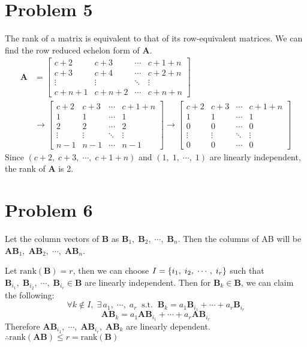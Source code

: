 \documentclass[10pt]{article}
\begin{document}
\section*{Problem 5}
The rank of a matrix is equivalent to that of its row-equivalent matrices.
We can find the row reduced echelon form of $\mathbf{A}$.
\begin{align*}
    \mathbf{A} &= \begin{bmatrix}
        c+2 & c+3 & \cdots & c+1+n \\
        c+3 & c+4 & \cdots & c+2+n \\
        \vdots & \vdots & \ddots & \vdots \\
        c+n+1 & c+n+2 & \cdots & c+n+n
    \end{bmatrix} \\
    &\rightarrow \begin{bmatrix}
        c+2 & c+3 & \cdots & c+1+n \\
        1 & 1 & \cdots & 1 \\
        2 & 2 & \cdots & 2 \\
        \vdots & \vdots & \ddots & \vdots \\
        n-1 & n-1 & \cdots & n-1
    \end{bmatrix} 
    \rightarrow \begin{bmatrix}
        c+2 & c+3 & \cdots & c+1+n \\
        1 & 1 & \cdots & 1 \\
        0 & 0 & \cdots & 0 \\
        \vdots & \vdots & \ddots & \vdots \\
        0 & 0 & \cdots & 0
    \end{bmatrix}
\end{align*}
Since $(c+2, \; c+3, \; \cdots, \; c+1+n)$ and $(1, \; 1, \; \cdots, \; 1)$ are linearly independent, the rank of $\mathbf{A}$ is 2.

\section*{Problem 6}
Let the column vectors of $\mathbf{B}$ as $\mathbf{B}_1, \; \mathbf{B}_2, \; \cdots , \; \mathbf{B}_n$.
Then the columns of AB will be $\mathbf{AB}_1, \; \mathbf{AB}_2, \; \cdots , \; \mathbf{AB}_n$.
\vspace{2mm}

Let $\mathrm{rank}(\mathbf{B}) = r$, then we can choose $I = \qty{i_1, \; i_2, \; \cdots , \; i_r}$ such that $\mathbf{B}_{i_1}, \; \mathbf{B}_{i_2}, \; \cdots , \; \mathbf{B}_{i_r} \in \mathbf{B}$ are linearly independent.
Then for $\mathbf{B}_k \in \mathbf{B}$, we can claim the following:
$$\forall k \notin I, \; \exists \, a_1, \; \cdots ,\; a_r \;\; \mathrm{s.t.} \;\; \mathbf{B}_k = a_1\mathbf{B}_{i_1} + \cdots + a_r\mathbf{B}_{i_r}$$
$$\mathbf{AB}_k = a_1\mathbf{AB}_{i_1} + \cdots + a_r\mathbf{AB}_{i_r}$$
Therefore $\mathbf{AB}_{i_1}, \; \cdots , \; \mathbf{AB}_{i_r}, \; \mathbf{AB}_k$ are linearly dependent.
$\therefore \mathrm{rank}(\mathbf{AB}) \leq r = \mathrm{rank}(\mathbf{B})$
\vspace{2mm}
\end{document}

